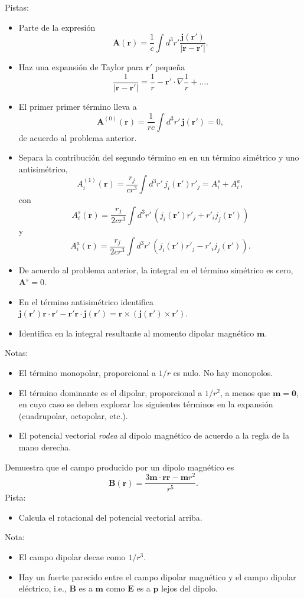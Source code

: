 \documentclass{exam}
\begin{document}
\begin{questions}
  Pistas:
  \begin{itemize}
  \item Parte de la expresión
    $$ \bm A(\bm r)=\frac{1}{c}\int d^3r' \frac{\bm j(\bm r')}{|\bm
      r-\bm r'|}.
    $$
  \item Haz una expansión de Taylor para $\bm r'$ pequeña
    $$
    \frac{1}{|\bm r-\bm r'|}=\frac{1}{r}-\bm r'\cdot\nabla\frac{1}{r}+\ldots.
    $$
  \item El primer primer término lleva a
    $$\bm A^{(0)}(\bm r)=\frac{1}{rc}\int d^3r'\,\bm j(\bm r')=0,$$
    de acuerdo al problema anterior.
  \item Separa la contribución del segundo término en en un término simétrico y uno
    antisimétrico,
    $$A_i^{(1)}(\bm r)=\frac{r_j}{cr^3}\int d^3r'\, j_i(\bm r')r'_j=A_i^s+A_i^a,$$
    con
    $$A_i^s(\bm r)=\frac{r_j}{2cr^3}\int d^3r'\, (j_i(\bm
    r')r'_j+r'_i j_j(\bm r'))$$
    y
    $$A_i^a(\bm r)=\frac{r_j}{2cr^3}\int d^3r'\, (j_i(\bm
    r')r'_j-r'_i j_j(\bm r')).$$
  \item De acuerdo al problema anterior, la integral en el término
    simétrico es cero, $\bm A^s=0$.
  \item En el término antisimétrico identifica
    $\bm j(\bm r')\bm r\cdot\bm r'-\bm r'\bm r\cdot\bm j(\bm r')=\bm r\times(\bm
    j(\bm r')\times\bm r')$.
  \item Identifica en la integral resultante al momento dipolar
    magnético $\bm m$.
  \end{itemize}
  Notas:
  \begin{itemize}
  \item El término monopolar, proporcional a $1/r$ es nulo. No hay
    monopolos.
  \item El término dominante es el dipolar, proporcional a $1/r^2$, a
    menos que $\bm m=\bm 0$, en cuyo caso se deben explorar los
    siguientes términos en la expansión (cuadrupolar, octopolar,
    etc.).
  \item El potencial vectorial {\em rodea} al dipolo magnético de
    acuerdo a la regla de la mano derecha.
  \end{itemize}

\question Demuestra que el campo producido por un dipolo
  magnético es
  $$
  \bm B(\bm r)=\frac{3\bm m\cdot\bm r\bm r-\bm m r^2}{r^5}.
  $$
  Pista:
  \begin{itemize}
  \item Calcula el rotacional del potencial vectorial arriba.
  \end{itemize}
  Nota:
  \begin{itemize}
  \item El campo dipolar decae como $1/r^3$.
  \item Hay un fuerte parecido entre el campo dipolar magnético y el
    campo dipolar eléctrico, i.e., $\bm B$ es a $\bm m$ como $\bm E$ es
    a $\bm p$ lejos del dipolo.
  \end{itemize}


\end{questions}
\end{document}
